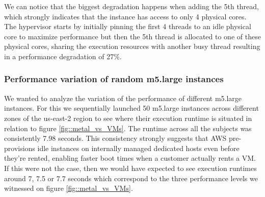 \noindent
We can notice that the biggest degradation happens when adding the 5th thread, which strongly indicates 
that the instance has access to only 4 physical cores. The hypervisor starts by initially pinning the 
first 4 threads to an idle physical core to maximize performance but then the 5th thread is allocated 
to one of these physical cores, sharing the execution resources with another busy thread resulting in 
a performance degradation of 27\%.  \\
\subsubsection{Performance variation of random m5.large instances}
We wanted to analyze the variation of the performance of different m5.large instances. For this we 
sequentially launched 50 m5.large instances across different zones of the us-east-2 region to see where their 
execution runtime is situated in relation to figure \ref{fig::metal_vs_VMs}. The runtime across all the subjects
was consistently 7.98 seconds. This consistency strongly suggests that AWS pre-provisions idle instances on 
internally managed dedicated hosts even before they're rented, enabling faster boot times 
when a customer actually rents a VM. If this were not the case, then we would have expected to see 
execution runtimes around  7, 7.5 or 7.7 seconds which correspond to the three performance 
levels we witnessed on figure \ref{fig::metal_vs_VMs}. 

